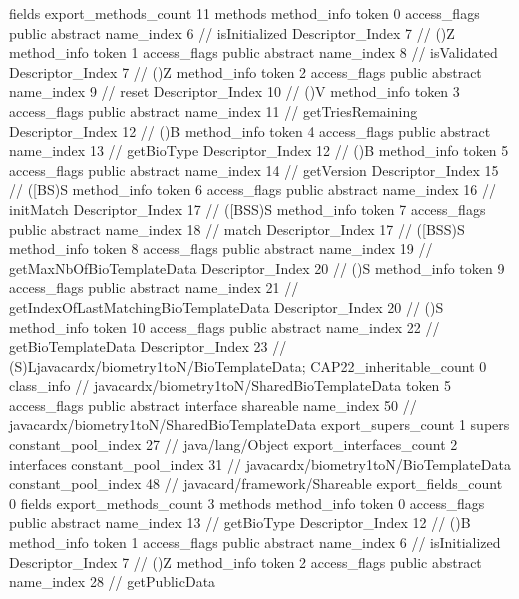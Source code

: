 {{{			fields {
			}
			export_methods_count	11
			methods {
				method_info {
					token	0
					access_flags	public abstract
					name_index	6		// isInitialized
					Descriptor_Index	7		// ()Z
				}
				method_info {
					token	1
					access_flags	public abstract
					name_index	8		// isValidated
					Descriptor_Index	7		// ()Z
				}
				method_info {
					token	2
					access_flags	public abstract
					name_index	9		// reset
					Descriptor_Index	10		// ()V
				}
				method_info {
					token	3
					access_flags	public abstract
					name_index	11		// getTriesRemaining
					Descriptor_Index	12		// ()B
				}
				method_info {
					token	4
					access_flags	public abstract
					name_index	13		// getBioType
					Descriptor_Index	12		// ()B
				}
				method_info {
					token	5
					access_flags	public abstract
					name_index	14		// getVersion
					Descriptor_Index	15		// ([BS)S
				}
				method_info {
					token	6
					access_flags	public abstract
					name_index	16		// initMatch
					Descriptor_Index	17		// ([BSS)S
				}
				method_info {
					token	7
					access_flags	public abstract
					name_index	18		// match
					Descriptor_Index	17		// ([BSS)S
				}
				method_info {
					token	8
					access_flags	public abstract
					name_index	19		// getMaxNbOfBioTemplateData
					Descriptor_Index	20		// ()S
				}
				method_info {
					token	9
					access_flags	public abstract
					name_index	21		// getIndexOfLastMatchingBioTemplateData
					Descriptor_Index	20		// ()S
				}
				method_info {
					token	10
					access_flags	public abstract
					name_index	22		// getBioTemplateData
					Descriptor_Index	23		// (S)Ljavacardx/biometry1toN/BioTemplateData;
				}
			}
			CAP22_inheritable_count	0
		}
		class_info {		// javacardx/biometry1toN/SharedBioTemplateData
			token	5
			access_flags	public abstract interface shareable
			name_index	50		// javacardx/biometry1toN/SharedBioTemplateData
			export_supers_count	1
			supers {
				constant_pool_index	27		// java/lang/Object
			}
			export_interfaces_count	2
			interfaces {
				constant_pool_index	31		// javacardx/biometry1toN/BioTemplateData
				constant_pool_index	48		// javacard/framework/Shareable
			}
			export_fields_count	0
			fields {
			}
			export_methods_count	3
			methods {
				method_info {
					token	0
					access_flags	public abstract
					name_index	13		// getBioType
					Descriptor_Index	12		// ()B
				}
				method_info {
					token	1
					access_flags	public abstract
					name_index	6		// isInitialized
					Descriptor_Index	7		// ()Z
				}
				method_info {
					token	2
					access_flags	public abstract
					name_index	28		// getPublicData
}}}}}
